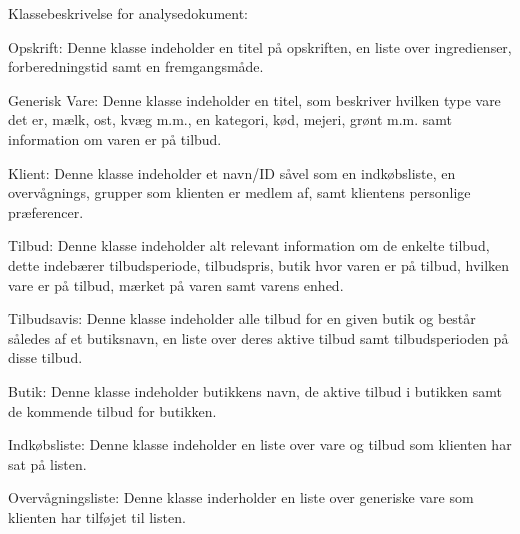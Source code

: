 Klassebeskrivelse for analysedokument:

Opskrift:
Denne klasse indeholder en titel på opskriften, en liste over ingredienser, forberedningstid samt en fremgangsmåde. 

Generisk Vare:
Denne klasse indeholder en titel, som beskriver hvilken type vare det er, mælk, ost, kvæg m.m., en kategori, kød, mejeri, grønt m.m. samt information om varen er på tilbud.

Klient:
Denne klasse indeholder et navn/ID såvel som en indkøbsliste, en overvågnings, grupper som klienten er medlem af, samt klientens personlige præferencer.

Tilbud:
Denne klasse indeholder alt relevant information om de enkelte tilbud, dette indebærer tilbudsperiode, tilbudspris, butik hvor varen er på tilbud, hvilken vare er på tilbud, mærket på varen samt varens enhed.

Tilbudsavis:
Denne klasse indeholder alle tilbud for en given butik og består således af et butiksnavn, en liste over deres aktive tilbud samt tilbudsperioden på disse tilbud.

Butik:
Denne klasse indeholder butikkens navn, de aktive tilbud i butikken samt de kommende tilbud for butikken.

Indkøbsliste:
Denne klasse indeholder en liste over vare og tilbud som klienten har sat på listen.

Overvågningsliste:
Denne klasse inderholder en liste over generiske vare som klienten har tilføjet til listen.